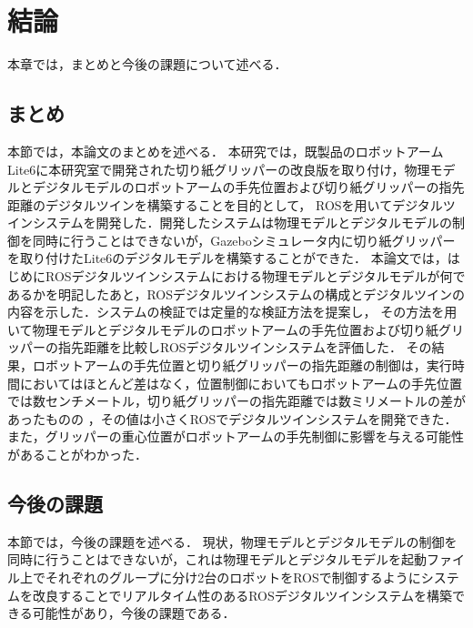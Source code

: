 ﻿\chapter{%
結論}
本章では，まとめと今後の課題について述べる．

\section{まとめ}
本節では，本論文のまとめを述べる．
本研究では，既製品のロボットアームLite6に本研究室で開発された切り紙グリッパーの改良版を取り付け，物理モデルとデジタルモデルのロボットアームの手先位置および切り紙グリッパーの指先距離のデジタルツインを構築することを目的として，
ROSを用いてデジタルツインシステムを開発した．開発したシステムは物理モデルとデジタルモデルの制御を同時に行うことはできないが，Gazeboシミュレータ内に切り紙グリッパーを取り付けたLite6のデジタルモデルを構築することができた．
本論文では，はじめにROSデジタルツインシステムにおける物理モデルとデジタルモデルが何であるかを明記したあと，ROSデジタルツインシステムの構成とデジタルツインの内容を示した．システムの検証では定量的な検証方法を提案し，
その方法を用いて物理モデルとデジタルモデルのロボットアームの手先位置および切り紙グリッパーの指先距離を比較しROSデジタルツインシステムを評価した．
その結果，ロボットアームの手先位置と切り紙グリッパーの指先距離の制御は，実行時間においてはほとんど差はなく，位置制御においてもロボットアームの手先位置では数センチメートル，切り紙グリッパーの指先距離では数ミリメートルの差があったものの
，その値は小さくROSでデジタルツインシステムを開発できた．また，グリッパーの重心位置がロボットアームの手先制御に影響を与える可能性があることがわかった．

\section{今後の課題}
本節では，今後の課題を述べる．
現状，物理モデルとデジタルモデルの制御を同時に行うことはできないが，これは物理モデルとデジタルモデルを起動ファイル上でそれぞれのグループに分け2台のロボットをROSで制御するようにシステムを改良することでリアルタイム性のあるROSデジタルツインシステムを構築できる可能性があり，今後の課題である．